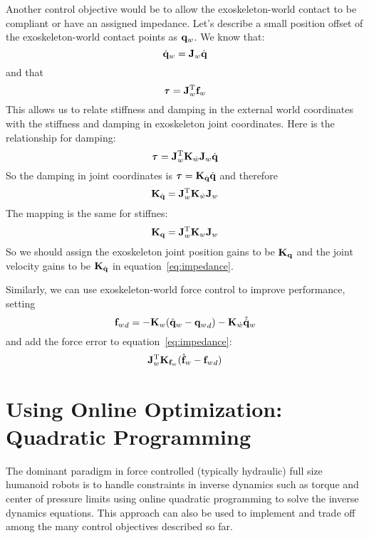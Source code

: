 \documentclass[letterpaper,12pt,fullpage]{article}
\begin{document}
Another control objective would be to allow the exoskeleton-world contact to
be compliant or have an assigned impedance.
Let's describe a small position offset of the exoskeleton-world
contact points as ${\bf q}_w$. We know that:
\begin{equation}
\dot{{\bf q}}_w = {\bf J}_w \dot{{\bf q}}
\end{equation}
and that
\begin{equation}
\vtau = \mJ_w^{\tr} \vf_w 
\end{equation}
This allows us to relate stiffness and damping in the external world coordinates
with the stiffness and damping in exoskeleton joint coordinates.
Here is the relationship for damping:
\begin{equation}
\vtau = \mJ_w^{\tr} \mK_{\dot{w}} \mJ_w \dot{\vq}
\end{equation}
So the damping in joint coordinates is $\vtau = \mK_{\dot{\vq}} \dot{\vq}$ and
therefore
\begin{equation}
{\bf K}_{\dot{{\bf q}}} = {\bf J}_w^{{\rm T}} {\bf K}_{\dot{w}} {\bf J}_w
\end{equation}
The mapping is the same for stiffnes:
\begin{equation}
{\bf K}_{{\bf q}} = {\bf J}_w^{{\rm T}} {\bf K}_{w} {\bf J}_w
\end{equation}
So we should assign the exoskeleton joint position gains to be ${\bf K}_{{\bf q}}$ and
the joint velocity gains to be ${\bf K}_{\dot{{\bf q}}}$ in equation~\ref{eq:impedance}.

Similarly, we can use exoskeleton-world force control to improve performance,
setting
\begin{equation}
{{\bf f}_w}_d = - {\bf K}_w ( \hat{{\bf q}}_w - {{\bf q}_w}_d ) - {\bf K}_{\dot{w}} \hat{\dot{{\bf q}}}_w
\end{equation}
and add the force error to equation~\ref{eq:impedance}: 
\begin{equation}
{\bf J}_w^{{\rm T}} {\bf K}_{{\bf f}_w} ( \hat{{\bf f}}_w - {{\bf f}_w}_d )
\end{equation}

\section{Using Online Optimization: Quadratic Programming}
\label{sec:qp}

The dominant paradigm in force controlled (typically
hydraulic) full size humanoid robots is to handle constraints in inverse dynamics
such as torque and center of pressure limits using online quadratic programming
to solve the inverse dynamics equations. This approach can also be used
to implement and trade off among the many control objectives described so far.
\end{document}
